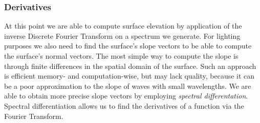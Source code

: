\subsubsection{Derivatives}
At this point we are able to compute surface elevation by application of the
inverse Discrete Fourier Transform on a spectrum we generate. For lighting
purposes we also need to find the surface's slope vectors to be able to compute
the surface's normal vectors. The most simple way to compute the slope is
through finite differences in the spatial domain of the surface. Such an
approach is efficient memory- and computation-wise, but may lack quality,
because it can be a poor approximation to the slope of waves with small
wavelengths. We are able to obtain more precise slope vectors by employing
\emph{spectral differentation}. Spectral differentiation allows us to find
the derivatives of a function via the Fourier Transform.\\


